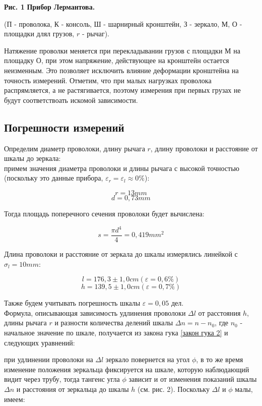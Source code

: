 \begin{flushright}
{\scriptsize \textbf{Рис. 1} \textbf {Прибор Лермантова.}}
\end{flushright}

    (П - проволока, К - консоль, Ш - шарнирный  кронштейн, З - зеркало, М, О - площадки длял грузов, $r$ - рычаг).
    
    Натяжение проволки меняется при перекладывании грузов с площадки М на площадку О, при этом напряжение, действующее на кронштейн остается неизменным. Это позволяет исключить влияние деформации кронштейна на точность измерений. Отметим, что при малых нагрузках проволока распрямляется, а не растягивается, поэтому измерения при первых грузах не будут соответствоать искомой зависимости.
\subsection{Погрешности измерений}

    Определим диаметр проволоки, длину рычага $r$, длину проволоки и расстояние от шкалы до зеркала:\\
    
    примем значения диаметра проволоки и длины рычага с высокой точностью (поскольку это данные прибора, $\varepsilon_r = \varepsilon_l \approx 0 \%$):
    
\[r = 13 mm\]
\[d = 0,73 mm\]

    Тогда площадь поперечного сечения проволоки будет вычислена:
    
\[s = \frac{\pi d^4}{4} = 0,419 mm^2\]

    Длина проволоки и расстояние от зеркала до шкалы измерялись линейкой с $\sigma_l = 10 mm$:
    
\[l = 176,3 \pm 1,0 cm (\varepsilon = 0,6 \%)\]
\[h = 139,5 \pm 1,0 cm (\varepsilon = 0,7 \%)\]

    Также будем учитывать погрешность шкалы $\varepsilon = 0,05$ дел.\\


    Формула, описывающая зависимость удлинения проволоки $\Delta l$ от расстояния $h$, длины рычага $r$  и разности количества делений шкалы $\Delta n = n - n_0$, где $n_0$ - начальное значение по шкале, получается из закона гука \eqref{закон гука 2} и следующих уравнений:
    
    при удлинении проволоки на $\Delta l$ зеркало повернется на угол $\phi$, в то же время изменение положения зеркальца фиксируется на шкале, которую наблюдающий видит через трубу, тогда тангенс угла $\phi$ зависит и от изменения показаний шкалы $\Delta n$ и расстояния от зеркальца до шкалы $h$ (см. рис. 2). Поскольку $\Delta l$ и $\phi$ малы, имеем:
    
